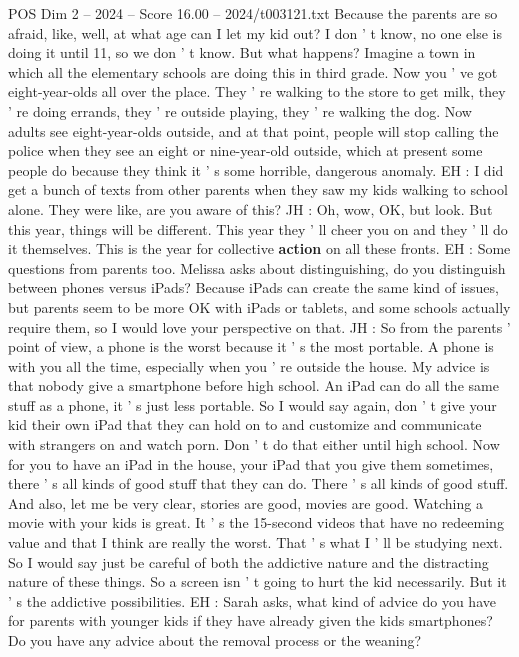 \begin{textsample}{POS Dim 2 – 2024 – Score 16.00 – 2024/t003121.txt}
Because the parents are so afraid, like, well, at what age can I let my kid out?
I don ' t know, no one else is doing it until 11, so we don ' t know.
But what happens?
Imagine a town in which all the elementary schools are doing this in third grade.
Now you ' ve got eight-year-olds all over the place.
They ' re walking to the store to get milk, they ' re doing errands, they ' re outside playing, they ' re walking the dog.
Now adults see eight-year-olds outside, and at that point, people will stop calling the police when they see an eight or nine-year-old outside, which at present some people do because they think it ' s some horrible, dangerous anomaly.
EH : I did get a bunch of texts from other parents when they saw my kids walking to school alone.
They were like, are you aware of this?
JH : Oh, wow, OK, but look.
But this year, things will be different.
This year they ' ll cheer you on and they ' ll do it themselves.
This is the year for collective \textbf{action} on all these fronts.
EH : Some questions from parents too.
Melissa asks about distinguishing, do you distinguish between phones versus iPads?
Because iPads can create the same kind of issues, but parents seem to be more OK with iPads or tablets, and some schools actually require them, so I would love your perspective on that.
JH : So from the parents ' point of view, a phone is the worst because it ' s the most portable.
A phone is with you all the time, especially when you ' re outside the house.
My advice is that nobody give a smartphone before high school.
An iPad can do all the same stuff as a phone, it ' s just less portable.
So I would say again, don ' t give your kid their own iPad that they can hold on to and customize and communicate with strangers on and watch porn.
Don ' t do that either until high school.
Now for you to have an iPad in the house, your iPad that you give them sometimes, there ' s all kinds of good stuff that they can do.
There ' s all kinds of good stuff.
And also, let me be very clear, stories are good, movies are good.
Watching a movie with your kids is great.
It ' s the 15-second videos that have no redeeming value and that I think are really the worst.
That ' s what I ' ll be studying next.
So I would say just be careful of both the addictive nature and the distracting nature of these things.
So a screen isn ' t going to hurt the kid necessarily.
But it ' s the addictive possibilities.
EH : Sarah asks, what kind of advice do you have for parents with younger kids if they have already given the kids smartphones?
Do you have any advice about the removal process or the weaning?

\end{textsample}
